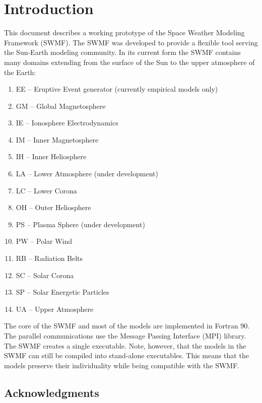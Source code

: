 


\chapter{Introduction}

This document describes a working prototype of the 
Space Weather Modeling Framework (SWMF).
The SWMF was developed to provide a flexible tool serving the Sun-Earth
modeling community.  In its current form the SWMF contains many 
domains extending from the surface of the Sun to the upper atmosphere of the 
Earth: 
\begin{enumerate}
\item EE -- Eruptive Event generator (currently empirical models only)
\item GM -- Global Magnetosphere 
\item IE -- Ionosphere Electrodynamics
\item IM -- Inner Magnetosphere
\item IH -- Inner Heliosphere
\item LA -- Lower Atmosphere (under development)
\item LC -- Lower Corona
\item OH -- Outer Heliosphere
\item PS -- Plasma Sphere (under development)
\item PW -- Polar Wind
\item RB -- Radiation Belts
\item SC -- Solar Corona
\item SP -- Solar Energetic Particles 
\item UA -- Upper Atmosphere
\end{enumerate}
The core of the SWMF and most of the models are implemented in Fortran 90. 
The parallel communications use the Message Passing Interface (MPI) library. 
The SWMF creates a single executable. Note, however, that the
models in the SWMF can still be compiled into stand-alone executables.
This means that the models preserve their individuality while being
compatible with the SWMF.

\section{Acknowledgments}

